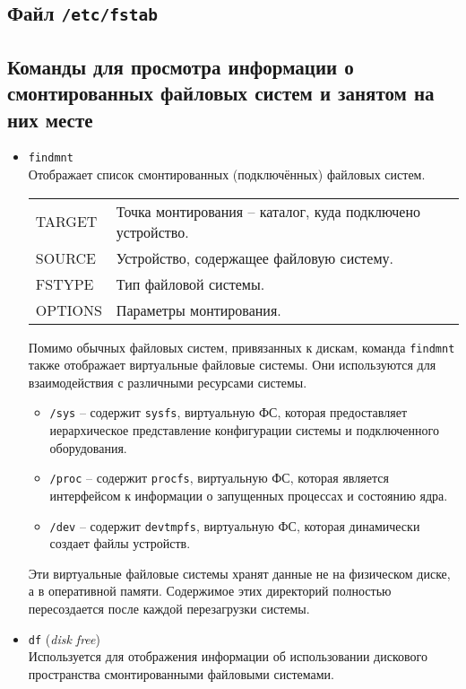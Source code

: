 \documentclass[10pt]{article}
\begin{document}
\subsection*{Файл \texttt{/etc/fstab}}

\newpage
\subsection*{Команды для просмотра информации о смонтированных файловых систем и занятом на них месте}
\begin{itemize}
\item \texttt{findmnt} \\
Отображает список смонтированных (подключённых) файловых систем.

\begin{tabular}{ p{3cm} | l }
TARGET & Точка монтирования -- каталог, куда подключено устройство.\\
SOURCE & Устройство, содержащее файловую систему.\\
FSTYPE & Тип файловой системы.\\
OPTIONS & Параметры монтирования.\\
\end{tabular}

Помимо обычных файловых систем, привязанных к дискам, команда \texttt{findmnt} также отображает виртуальные файловые системы. Они используются для взаимодействия с различными ресурсами системы.
\begin{itemize}
\item \texttt{/sys} -- содержит \texttt{sysfs}, виртуальную ФС, которая предоставляет иерархическое представление конфигурации системы и подключенного оборудования.

\item \texttt{/proc} -- содержит \texttt{procfs}, виртуальную ФС, которая является интерфейсом к информации о запущенных процессах и состоянию ядра.

\item \texttt{/dev} -- содержит \texttt{devtmpfs}, виртуальную ФС, которая динамически создает файлы устройств.
\end{itemize}
Эти виртуальные файловые системы хранят данные не на физическом диске, а в оперативной памяти. Содержимое этих директорий полностью пересоздается после каждой перезагрузки системы.


\item \texttt{df} (\textit{disk free})\\
Используется для отображения информации об использовании дискового пространства смонтированными файловыми системами.


\end{itemize}
\end{document}
